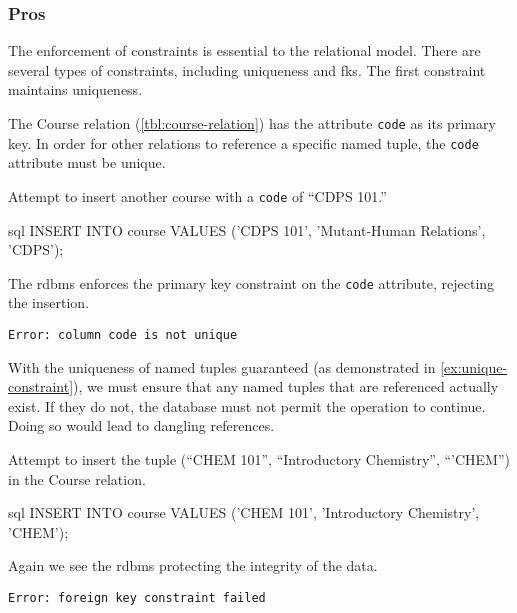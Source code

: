 		\subsubsection{Pros}
			The enforcement of constraints is essential to the relational model.  There are several types of constraints, including uniqueness and \glspl{fk}.  The first constraint maintains uniqueness.
			
			The Course relation (\vref{tbl:course-relation}) has the attribute \texttt{code} as its primary key.	In order for other relations to reference a specific named tuple, the \texttt{code} attribute must be unique.
			
			\begin{ex}
			\label{ex:unique-constraint}
				Attempt to insert another course with a \texttt{code} of ``CDPS 101.''
				
				\begin{singlespaced}
					\begin{pygments}{sql}
INSERT INTO course
VALUES      ('CDPS 101',
             'Mutant-Human Relations',
             'CDPS');
					\end{pygments}
				\end{singlespaced}
				
				The \gls{rdbms} enforces the primary key constraint on the \texttt{code} attribute, rejecting the insertion.
				
				\begin{verbatim}
Error: column code is not unique
				\end{verbatim}
			\end{ex}
			
			With the uniqueness of named tuples guaranteed (as demonstrated in \vref{ex:unique-constraint}), we must ensure that any named tuples that are referenced actually exist.  If they do not, the database must not permit the operation to continue.  Doing so would lead to dangling references.
			
			\begin{ex}
				Attempt to insert the tuple (``CHEM 101'', ``Introductory Chemistry'', ``'CHEM'') in the Course relation.
				
				\begin{singlespaced}
					\begin{pygments}{sql}
INSERT INTO course
VALUES      ('CHEM 101',
             'Introductory Chemistry',
             'CHEM');
					\end{pygments}
				\end{singlespaced}
				
				Again we see the \gls{rdbms} protecting the integrity of the data.
				
				\begin{verbatim}
Error: foreign key constraint failed
				\end{verbatim}
			\end{ex}
			
